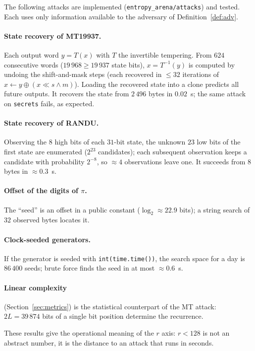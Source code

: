 \documentclass[11pt,a4paper]{article}
\theoremstyle{plain}
\theoremstyle{definition}
\begin{document}
The following attacks are implemented (\texttt{entropy\_arena/attacks}) and
tested. Each uses only information available to the adversary of
Definition~\ref{def:adv}.

\paragraph{State recovery of MT19937.} Each output word $y=T(x)$ with $T$ the
invertible tempering. From $624$ consecutive words ($19\,968\ge19\,937$ state
bits), $x=T^{-1}(y)$ is computed by undoing the shift-and-mask steps
(each recovered in $\le32$ iterations of $x\leftarrow y\oplus(x\ll s\wedge m)$).
Loading the recovered state into a clone predicts all future outputs. It
recovers the state from $2\,496$ bytes in $0.02$~s; the same attack on
\texttt{secrets} fails, as expected.

\paragraph{State recovery of RANDU.} Observing the $8$ high bits of each
$31$-bit state, the unknown $23$ low bits of the first state are enumerated
($2^{23}$ candidates); each subsequent observation keeps a candidate with
probability $2^{-8}$, so $\approx4$ observations leave one. It succeeds from
$8$ bytes in $\approx0.3$~s.

\paragraph{Offset of the digits of $\pi$.} The ``seed'' is an offset in a public
constant ($\log_2\approx22.9$ bits); a string search of $32$ observed bytes
locates it.

\paragraph{Clock-seeded generators.} If the generator is seeded with
\texttt{int(time.time())}, the search space for a day is $86\,400$ seeds; brute
force finds the seed in at most $\approx0.6$~s.

\paragraph{Linear complexity} (Section~\ref{sec:metrics}) is the statistical
counterpart of the MT attack: $2L=39\,874$ bits of a single bit position
determine the recurrence.

These results give the operational meaning of the $r$ axis: $r<128$ is not an
abstract number, it is the distance to an attack that runs in seconds.
\end{document}
